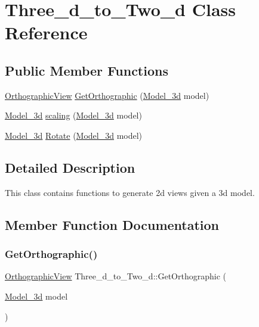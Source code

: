 \hypertarget{class_three__d__to___two__d}{}\section{Three\+\_\+d\+\_\+to\+\_\+\+Two\+\_\+d Class Reference}
\label{class_three__d__to___two__d}
\subsection*{Public Member Functions}
\begin{DoxyCompactItemize}
\item 
\hyperlink{class_orthographic_view}{Orthographic\+View} \hyperlink{class_three__d__to___two__d_a883014db1e688297b4073a46e4570d48}{Get\+Orthographic} (\hyperlink{class_model__3d}{Model\+\_\+3d} model)
\item 
\hyperlink{class_model__3d}{Model\+\_\+3d} \hyperlink{class_three__d__to___two__d_a4172439cbbc929c71679bc89a7603234}{scaling} (\hyperlink{class_model__3d}{Model\+\_\+3d} model)
\item 
\hyperlink{class_model__3d}{Model\+\_\+3d} \hyperlink{class_three__d__to___two__d_a70ef362316e790dfdbee41fc4b8f5576}{Rotate} (\hyperlink{class_model__3d}{Model\+\_\+3d} model)
\end{DoxyCompactItemize}


\subsection{Detailed Description}
This class contains functions to generate 2d views given a 3d model. 

\subsection{Member Function Documentation}
\mbox{\label{class_three__d__to___two__d_a883014db1e688297b4073a46e4570d48}} 
\subsubsection{\texorpdfstring{Get\+Orthographic()}{GetOrthographic()}}
{\footnotesize\ttfamily \hyperlink{class_orthographic_view}{Orthographic\+View} Three\+\_\+d\+\_\+to\+\_\+\+Two\+\_\+d\+::\+Get\+Orthographic (\begin{DoxyParamCaption}\item[{\hyperlink{class_model__3d}{Model\+\_\+3d}}]{model }\end{DoxyParamCaption})}


